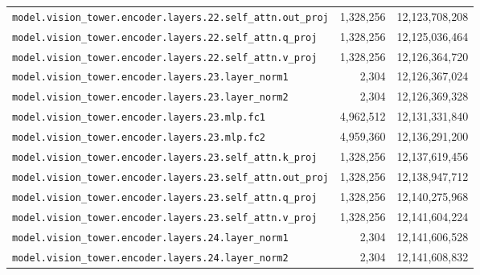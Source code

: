 \documentclass[10pt,a4paper]{article}
\theoremstyle{definition}
\begin{document}
\begin{appendices}
\begin{longtable}{p{9.5cm}rr}
\texttt{model.\allowbreak{}vision\_tower.\allowbreak{}encoder.\allowbreak{}layers.\allowbreak{}22.\allowbreak{}self\_attn.\allowbreak{}out\_proj} & 1,328,256 & 12,123,708,208 \\
\texttt{model.\allowbreak{}vision\_tower.\allowbreak{}encoder.\allowbreak{}layers.\allowbreak{}22.\allowbreak{}self\_attn.\allowbreak{}q\_proj} & 1,328,256 & 12,125,036,464 \\
\texttt{model.\allowbreak{}vision\_tower.\allowbreak{}encoder.\allowbreak{}layers.\allowbreak{}22.\allowbreak{}self\_attn.\allowbreak{}v\_proj} & 1,328,256 & 12,126,364,720 \\
\texttt{model.\allowbreak{}vision\_tower.\allowbreak{}encoder.\allowbreak{}layers.\allowbreak{}23.\allowbreak{}layer\_norm1} & 2,304 & 12,126,367,024 \\
\texttt{model.\allowbreak{}vision\_tower.\allowbreak{}encoder.\allowbreak{}layers.\allowbreak{}23.\allowbreak{}layer\_norm2} & 2,304 & 12,126,369,328 \\
\texttt{model.\allowbreak{}vision\_tower.\allowbreak{}encoder.\allowbreak{}layers.\allowbreak{}23.\allowbreak{}mlp.\allowbreak{}fc1} & 4,962,512 & 12,131,331,840 \\
\texttt{model.\allowbreak{}vision\_tower.\allowbreak{}encoder.\allowbreak{}layers.\allowbreak{}23.\allowbreak{}mlp.\allowbreak{}fc2} & 4,959,360 & 12,136,291,200 \\
\texttt{model.\allowbreak{}vision\_tower.\allowbreak{}encoder.\allowbreak{}layers.\allowbreak{}23.\allowbreak{}self\_attn.\allowbreak{}k\_proj} & 1,328,256 & 12,137,619,456 \\
\texttt{model.\allowbreak{}vision\_tower.\allowbreak{}encoder.\allowbreak{}layers.\allowbreak{}23.\allowbreak{}self\_attn.\allowbreak{}out\_proj} & 1,328,256 & 12,138,947,712 \\
\texttt{model.\allowbreak{}vision\_tower.\allowbreak{}encoder.\allowbreak{}layers.\allowbreak{}23.\allowbreak{}self\_attn.\allowbreak{}q\_proj} & 1,328,256 & 12,140,275,968 \\
\texttt{model.\allowbreak{}vision\_tower.\allowbreak{}encoder.\allowbreak{}layers.\allowbreak{}23.\allowbreak{}self\_attn.\allowbreak{}v\_proj} & 1,328,256 & 12,141,604,224 \\
\texttt{model.\allowbreak{}vision\_tower.\allowbreak{}encoder.\allowbreak{}layers.\allowbreak{}24.\allowbreak{}layer\_norm1} & 2,304 & 12,141,606,528 \\
\texttt{model.\allowbreak{}vision\_tower.\allowbreak{}encoder.\allowbreak{}layers.\allowbreak{}24.\allowbreak{}layer\_norm2} & 2,304 & 12,141,608,832 \\

\end{longtable}
\end{appendices}
\end{document}
